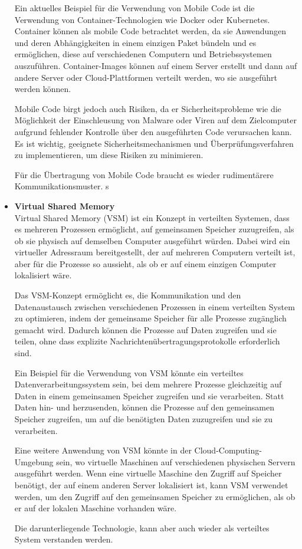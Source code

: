 \begin{itemize}
Ein aktuelles Beispiel für die Verwendung von Mobile Code ist die Verwendung von Container-Technologien wie Docker oder Kubernetes. Container können als mobile Code betrachtet werden, da sie Anwendungen und deren Abhängigkeiten in einem einzigen Paket bündeln und es ermöglichen, diese auf verschiedenen Computern und Betriebssystemen auszuführen. Container-Images können auf einem Server erstellt und dann auf andere Server oder Cloud-Plattformen verteilt werden, wo sie ausgeführt werden können.

Mobile Code birgt jedoch auch Risiken, da er Sicherheitsprobleme wie die Möglichkeit der Einschleusung von Malware oder Viren auf dem Zielcomputer aufgrund fehlender Kontrolle über den ausgeführten Code verursachen kann. Es ist wichtig, geeignete Sicherheitsmechanismen und Überprüfungsverfahren zu implementieren, um diese Risiken zu minimieren.

Für die Übertragung von Mobile Code braucht es wieder rudimentärere Kommunikationsmuster. s
\item \textbf{Virtual Shared Memory} \\
Virtual Shared Memory (VSM) ist ein Konzept in verteilten Systemen, dass es mehreren Prozessen ermöglicht, auf gemeinsamen Speicher zuzugreifen, als ob sie physisch auf demselben Computer ausgeführt würden. Dabei wird ein virtueller Adressraum bereitgestellt, der auf mehreren Computern verteilt ist, aber für die Prozesse so aussieht, als ob er auf einem einzigen Computer lokalisiert wäre.

Das VSM-Konzept ermöglicht es, die Kommunikation und den Datenaustausch zwischen verschiedenen Prozessen in einem verteilten System zu optimieren, indem der gemeinsame Speicher für alle Prozesse zugänglich gemacht wird. Dadurch können die Prozesse auf Daten zugreifen und sie teilen, ohne dass explizite Nachrichtenübertragungsprotokolle erforderlich sind.

Ein Beispiel für die Verwendung von VSM könnte ein verteiltes Datenverarbeitungssystem sein, bei dem mehrere Prozesse gleichzeitig auf Daten in einem gemeinsamen Speicher zugreifen und sie verarbeiten. Statt Daten hin- und herzusenden, können die Prozesse auf den gemeinsamen Speicher zugreifen, um auf die benötigten Daten zuzugreifen und sie zu verarbeiten.

Eine weitere Anwendung von VSM könnte in der Cloud-Computing-Umgebung sein, wo virtuelle Maschinen auf verschiedenen physischen Servern ausgeführt werden. Wenn eine virtuelle Maschine den Zugriff auf Speicher benötigt, der auf einem anderen Server lokalisiert ist, kann VSM verwendet werden, um den Zugriff auf den gemeinsamen Speicher zu ermöglichen, als ob er auf der lokalen Maschine vorhanden wäre.

Die darunterliegende Technologie, kann aber auch wieder als verteiltes System verstanden werden.
\end{itemize}
